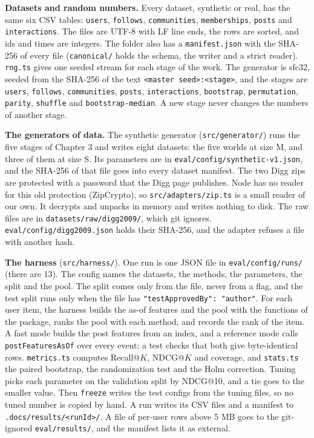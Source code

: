 \textbf{Datasets and random numbers.} Every dataset, synthetic or real, has the same six CSV tables: \texttt{users}, \texttt{follows}, \texttt{communities}, \texttt{memberships}, \texttt{posts} and \texttt{interactions}. The files are UTF-8 with LF line ends, the rows are sorted, and ids and times are integers. The folder also has a \texttt{manifest.json} with the SHA-256 of every file (\texttt{canonical/} holds the schema, the writer and a strict reader). \texttt{rng.ts} gives one seeded stream for each stage of the work. The generator is sfc32, seeded from the SHA-256 of the text \texttt{<master seed>:<stage>}, and the stages are \texttt{users}, \texttt{follows}, \texttt{communities}, \texttt{posts}, \texttt{interactions}, \texttt{bootstrap}, \texttt{permutation}, \texttt{parity}, \texttt{shuffle} and \texttt{bootstrap-median}. A new stage never changes the numbers of another stage.

\textbf{The generators of data.} The synthetic generator (\texttt{src/generator/}) runs the five stages of Chapter 3 and writes eight datasets: the five worlds at size M, and three of them at size S. Its parameters are in \texttt{eval/config/synthetic-v1.json}, and the SHA-256 of that file goes into every dataset manifest. The two Digg zips are protected with a password that the Digg page publishes. Node has no reader for this old protection (ZipCrypto), so \texttt{src/adapters/zip.ts} is a small reader of our own. It decrypts and unpacks in memory and writes nothing to disk. The raw files are in \texttt{datasets/raw/digg2009/}, which git ignores. \texttt{eval/config/digg2009.json} holds their SHA-256, and the adapter refuses a file with another hash.

\textbf{The harness} (\texttt{src/harness/}). One run is one JSON file in \texttt{eval/\allowbreak config/\allowbreak runs/} (there are 13). The config names the datasets, the methods, the parameters, the split and the pool. The split comes only from the file, never from a flag, and the test split runs only when the file has \texttt{"testApprovedBy": "author"}. For each user item, the harness builds the as-of features and the pool with the functions of the package, ranks the pool with each method, and records the rank of the item. A fast mode builds the post features from an index, and a reference mode calls \texttt{postFeaturesAsOf} over every event; a test checks that both give byte-identical rows. \texttt{metrics.ts} computes Recall@$K$, NDCG@$K$ and coverage, and \texttt{stats.ts} the paired bootstrap, the randomization test and the Holm correction. Tuning picks each parameter on the validation split by NDCG@10, and a tie goes to the smaller value. Then \texttt{freeze} writes the test configs from the tuning files, so no tuned number is copied by hand. A run writes its CSV files and a manifest to \texttt{.docs/results/<runId>/}. A file of per-user rows above 5 MB goes to the git-ignored \texttt{eval/results/}, and the manifest lists it as external.

